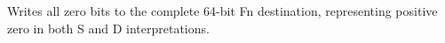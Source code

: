 Writes all zero bits to the complete 64-bit Fn destination, representing positive zero in both S and D interpretations.
